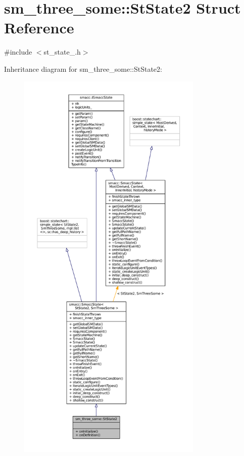 \hypertarget{structsm__three__some_1_1StState2}{}\section{sm\+\_\+three\+\_\+some\+:\+:St\+State2 Struct Reference}
\label{structsm__three__some_1_1StState2}


{\ttfamily \#include $<$st\+\_\+state\+\_.\+h$>$}



Inheritance diagram for sm\+\_\+three\+\_\+some\+:\+:St\+State2\+:
\nopagebreak
\begin{figure}[H]
\begin{center}
\leavevmode
\includegraphics[height=550pt]{structsm__three__some_1_1StState2__inherit__graph}
\end{center}
\end{figure}


